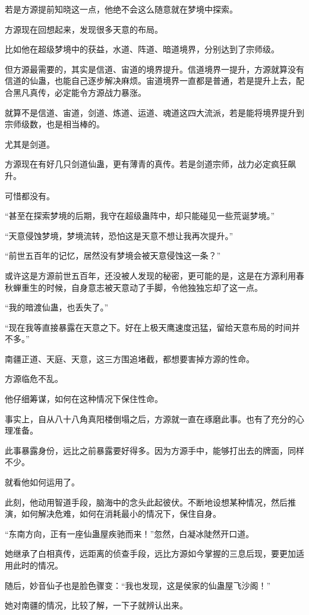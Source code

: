 \begin{this_body}
若是方源提前知晓这一点，他绝不会这么随意就在梦境中探索。

方源现在回想起来，发现很多天意的布局。

比如他在超级梦境中的获益，水道、阵道、暗道境界，分别达到了宗师级。

但方源最需要的，其实是信道、宙道的境界提升。信道境界一提升，方源就算没有信道的仙蛊，也能自己逐步解决麻烦。宙道境界一直都是普通，若是提升上去，配合黑凡真传，必定能令方源战力暴涨。

就算不是信道、宙道，剑道、炼道、运道、魂道这四大流派，若是能将境界提升到宗师级数，也是相当棒的。

尤其是剑道。

方源现在有好几只剑道仙蛊，更有薄青的真传。若是剑道宗师，战力必定疯狂飙升。

可惜都没有。

“甚至在探索梦境的后期，我守在超级蛊阵中，却只能碰见一些荒诞梦境。”

“天意侵蚀梦境，梦境流转，恐怕这是天意不想让我再次提升。”

“前世五百年的记忆，居然没有梦境会被天意侵蚀这一条？”

或许这是方源前世五百年，还没被人发现的秘密，更可能的是，这是在方源利用春秋蝉重生的时候，自身意志被天意动了手脚，令他独独忘却了这一点。

“我的暗渡仙蛊，也丢失了。”

“现在我等直接暴露在天意之下。好在上极天鹰速度迅猛，留给天意布局的时间并不多。”

南疆正道、天庭、天意，这三方围追堵截，都想要害掉方源的性命。

方源临危不乱。

他仔细筹谋，如何在这种情况下保住性命。

事实上，自从八十八角真阳楼倒塌之后，方源就一直在琢磨此事。也有了充分的心理准备。

此事暴露身份，远比之前暴露要好得多。因为方源手中，能够打出去的牌面，同样不少。

就看他如何运用了。

此刻，他动用智道手段，脑海中的念头此起彼伏。不断地设想某种情况，然后推演，如何解决危难，如何在消耗最小的情况下，保住自身。

“东南方向，正有一座仙蛊屋疾驰而来！”忽然，白凝冰陡然开口道。

她继承了白相真传，远距离的侦查手段，远比方源如今掌握的三息后现，要更加适用此时的情况。

随后，妙音仙子也是脸色骤变：“我也发现，这是侯家的仙蛊屋飞沙阁！”

她对南疆的情况，比较了解，一下子就辨认出来。


\end{this_body}
